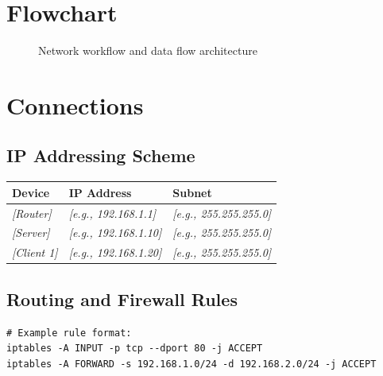 \documentclass[11pt,a4paper]{article}
\begin{document}
\section{Flowchart}
\begin{figure}[h!]
  \centering
  \caption{Network workflow and data flow architecture}
  \label{fig:flowchart}
\end{figure}

\section{Connections}

\subsection{IP Addressing Scheme}
\begin{tabularx}{\linewidth}{l X X}
  \toprule
  \textbf{Device} & \textbf{IP Address} & \textbf{Subnet} \\
  \midrule
  \textit{[Router]} & \textit{[e.g., 192.168.1.1]} & \textit{[e.g., 255.255.255.0]} \\
  \textit{[Server]} & \textit{[e.g., 192.168.1.10]} & \textit{[e.g., 255.255.255.0]} \\
  \textit{[Client 1]} & \textit{[e.g., 192.168.1.20]} & \textit{[e.g., 255.255.255.0]} \\
  \bottomrule
\end{tabularx}

\subsection{Routing and Firewall Rules}
\begin{verbatim}
# Example rule format:
iptables -A INPUT -p tcp --dport 80 -j ACCEPT
iptables -A FORWARD -s 192.168.1.0/24 -d 192.168.2.0/24 -j ACCEPT
\end{verbatim}
\end{document}

